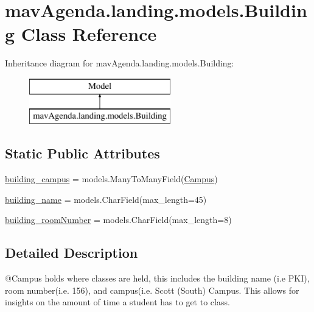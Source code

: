 \hypertarget{classmavAgenda_1_1landing_1_1models_1_1Building}{}\section{mav\+Agenda.\+landing.\+models.\+Building Class Reference}
\label{classmavAgenda_1_1landing_1_1models_1_1Building}
Inheritance diagram for mav\+Agenda.\+landing.\+models.\+Building\+:\begin{figure}[H]
\begin{center}
\leavevmode
\includegraphics[height=2.000000cm]{classmavAgenda_1_1landing_1_1models_1_1Building}
\end{center}
\end{figure}
\subsection*{Static Public Attributes}
\begin{DoxyCompactItemize}
\item 
\mbox{\hyperlink{classmavAgenda_1_1landing_1_1models_1_1Building_a577f67cf36c30d701b01ae6647f51fd6}{building\+\_\+campus}} = models.\+Many\+To\+Many\+Field(\mbox{\hyperlink{classmavAgenda_1_1landing_1_1models_1_1Campus}{Campus}})
\item 
\mbox{\hyperlink{classmavAgenda_1_1landing_1_1models_1_1Building_ab1c325b2f441c2d74a2ef9681c66910c}{building\+\_\+name}} = models.\+Char\+Field(max\+\_\+length=45)
\item 
\mbox{\hyperlink{classmavAgenda_1_1landing_1_1models_1_1Building_a3a5786ff03b783b329c063aabf12aaa1}{building\+\_\+room\+Number}} = models.\+Char\+Field(max\+\_\+length=8)
\end{DoxyCompactItemize}


\subsection{Detailed Description}
\begin{DoxyVerb}@Campus holds where classes are held, this includes the
        building name (i.e PKI), room number(i.e. 156), and campus(i.e. Scott (South) Campus.
        This allows for insights on the amount of time a student has to get to class.
\end{DoxyVerb}
 

